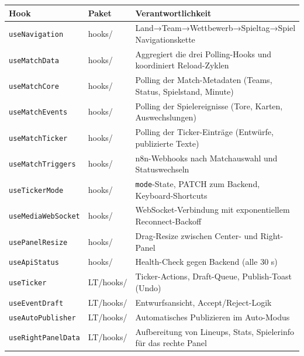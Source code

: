 {\def\LTcaptype{none} %
\begin{longtable}[]{@{}
  >{\raggedright\arraybackslash}p{}
  >{\raggedright\arraybackslash}p{}
  >{\raggedright\arraybackslash}p{}@{}}
\toprule\noalign{}
\begin{minipage}[b]{\linewidth}\raggedright
Hook
\end{minipage} & \begin{minipage}[b]{\linewidth}\raggedright
Paket
\end{minipage} & \begin{minipage}[b]{\linewidth}\raggedright
Verantwortlichkeit
\end{minipage} \\
\midrule\noalign{}
\endhead
\bottomrule\noalign{}
\endlastfoot
\texttt{useNavigation} & hooks/ & Land→Team→Wettbewerb→Spieltag→Spiel
Navigationskette \\
\texttt{useMatchData} & hooks/ & Aggregiert die drei Polling-Hooks und
koordiniert Reload-Zyklen \\
\texttt{useMatchCore} & hooks/ & Polling der Match-Metadaten (Teams,
Status, Spielstand, Minute) \\
\texttt{useMatchEvents} & hooks/ & Polling der Spielereignisse (Tore,
Karten, Auswechslungen) \\
\texttt{useMatchTicker} & hooks/ & Polling der Ticker-Einträge
(Entwürfe, publizierte Texte) \\
\texttt{useMatchTriggers} & hooks/ & n8n-Webhooks nach Matchauswahl und
Statuswechseln \\
\texttt{useTickerMode} & hooks/ & \texttt{mode}-State, PATCH zum
Backend, Keyboard-Shortcuts \\
\texttt{useMediaWebSocket} & hooks/ & WebSocket-Verbindung mit
exponentiellem Reconnect-Backoff \\
\texttt{usePanelResize} & hooks/ & Drag-Resize zwischen Center- und
Right-Panel \\
\texttt{useApiStatus} & hooks/ & Health-Check gegen Backend (alle 30
s) \\
\texttt{useTicker} & LT/hooks/ & Ticker-Actions, Draft-Queue,
Publish-Toast (Undo) \\
\texttt{useEventDraft} & LT/hooks/ & Entwurfsansicht,
Accept/Reject-Logik \\
\texttt{useAutoPublisher} & LT/hooks/ & Automatisches Publizieren im
Auto-Modus \\
\texttt{useRightPanelData} & LT/hooks/ & Aufbereitung von Lineups,
Stats, Spielerinfo für das rechte Panel \\
\end{longtable}
}

